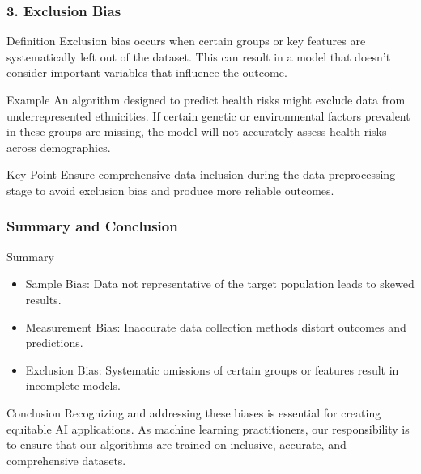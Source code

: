\documentclass[aspectratio=169]{beamer}
\begin{document}
\begin{frame}[fragile]
    \frametitle{3. Exclusion Bias}
    \begin{block}{Definition}
        Exclusion bias occurs when certain groups or key features are systematically left out of the dataset. 
        This can result in a model that doesn’t consider important variables that influence the outcome.
    \end{block}
    \begin{block}{Example}
        An algorithm designed to predict health risks might exclude data from underrepresented ethnicities. If certain genetic or environmental factors prevalent in these groups are missing, the model will not accurately assess health risks across demographics.
    \end{block}
    \begin{block}{Key Point}
        Ensure comprehensive data inclusion during the data preprocessing stage to avoid exclusion bias and produce more reliable outcomes.
    \end{block}
\end{frame}

\begin{frame}[fragile]
    \frametitle{Summary and Conclusion}
    \begin{block}{Summary}
        \begin{itemize}
            \item Sample Bias: Data not representative of the target population leads to skewed results.
            \item Measurement Bias: Inaccurate data collection methods distort outcomes and predictions.
            \item Exclusion Bias: Systematic omissions of certain groups or features result in incomplete models.
        \end{itemize}
    \end{block}
    \begin{block}{Conclusion}
        Recognizing and addressing these biases is essential for creating equitable AI applications. 
        As machine learning practitioners, our responsibility is to ensure that our algorithms are trained on inclusive, accurate, and comprehensive datasets.
    \end{block}
\end{frame}
\end{document}
